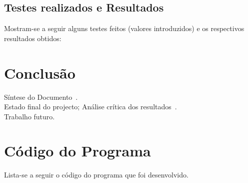 \documentclass{report}
\begin{document}
\section{Testes realizados e Resultados}
Mostram-se a seguir alguns testes feitos (valores introduzidos) e
os respectivos resultados obtidos:



\chapter{Conclusão} \label{concl}
Síntese do Documento~.\\
Estado final do projecto; Análise crítica dos resultados~.\\
Trabalho futuro.

\appendix
\chapter{Código do Programa}

Lista-se a seguir o código  do programa  que foi desenvolvido.




\end{document}

